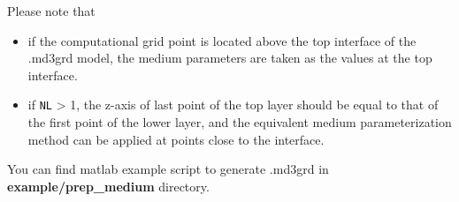 Please note that
\begin{itemize}
  \item if the computational grid point is located above the top interface of the .md3grd model,
the medium parameters are taken as the values at the top interface.
  \item if \texttt{NL} > 1, the z-axis of last point of the top layer should be equal to that of
    the first point of the lower layer,
    and the equivalent medium parameterization method can be applied at points close to the interface.
\end{itemize}

You can find matlab example script to generate .md3grd in \textbf{example/prep\_medium} directory.

